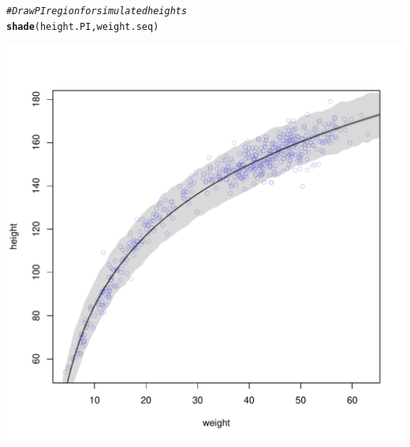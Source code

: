 \documentclass[12pt]{article}\usepackage[]{graphicx}\usepackage[]{color}
\makeatletter
\def\maxwidth{ %
  \ifdim\Gin@nat@width>\linewidth
    \linewidth
  \else
    \Gin@nat@width
  \fi
}
\newcommand{\hlcom}[1]{\textcolor[rgb]{0.678,0.584,0.686}{\textit{#1}}}%
\newcommand{\hlstd}[1]{\textcolor[rgb]{0.345,0.345,0.345}{#1}}%
\newcommand{\hlkwd}[1]{\textcolor[rgb]{0.737,0.353,0.396}{\textbf{#1}}}%
\newenvironment{kframe}{%
 \def\at@end@of@kframe{}%
 \ifinner\ifhmode%
  \def\at@end@of@kframe{\end{minipage}}%
  \begin{minipage}{\columnwidth}%
 \fi\fi%
 \def\FrameCommand##1{\hskip\@totalleftmargin \hskip-\fboxsep
 \colorbox{shadecolor}{##1}\hskip-\fboxsep
     \hskip-\linewidth \hskip-\@totalleftmargin \hskip\columnwidth}%
 \MakeFramed {\advance\hsize-\width
   \@totalleftmargin\z@ \linewidth\hsize
   \@setminipage}}%
 {\par\unskip\endMakeFramed%
 \at@end@of@kframe}
\newenvironment{knitrout}{}{} %
\makeatother
\begin{document}
\begin{enumerate}[(a)]
\begin{knitrout}
\begin{kframe}
\begin{alltt}
\hlcom{#Draw PI region for simulated heights}
\hlkwd{shade}\hlstd{(height.PI, weight.seq)}
\end{alltt}
\end{kframe}
\includegraphics[width=\maxwidth]{figure/unnamed-chunk-10-1} 

\end{knitrout}


\end{enumerate}
\end{document}
